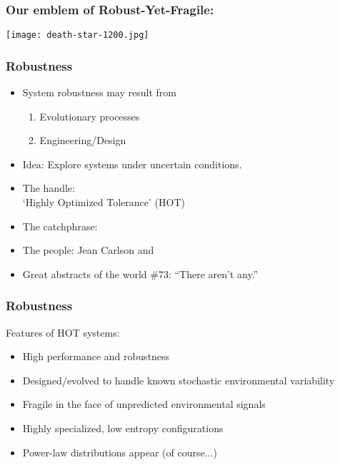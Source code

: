 
\begin{frame}
  \frametitle{Our emblem of Robust-Yet-Fragile:}

  \texttt{[image: death-star-1200.jpg]}

\end{frame}


\begin{frame}
  \frametitle{Robustness}
    
  \begin{block}{}
    \begin{itemize}
    \item<1-> 
      System robustness may result from 
      \begin{enumerate}
      \item<2-> 
        \alert{Evolutionary processes}
      \item<3-> 
        \alert{Engineering/Design}
      \end{enumerate}
    \item <4-> Idea: Explore systems 
      under \alert{uncertain conditions}.
    \item <5-> 
      The handle:\\
      `Highly Optimized Tolerance' (HOT)\cite{carlson1999a,carlson2000a,carlson2002a,sornette2003a}
    \item <6-> 
      The catchphrase: 
    \item <7-> 
      The people: Jean Carlson and 
    \item <8-> 
      Great abstracts of the world \#73: ``There aren't any.''\cite{doyle1978a}
    \end{itemize}
  \end{block}

\end{frame}

\begin{frame}
  \frametitle{Robustness}

  \begin{block}{Features of HOT systems:\cite{carlson2000a,carlson2002a}}
    \begin{itemize}
    \item<2-> 
      High performance and robustness
    \item<3-> 
      Designed/evolved to handle known 
      stochastic environmental variability
    \item<4-> 
      \alert{Fragile} in the face of unpredicted environmental signals
    \item<5-> 
      Highly specialized, low entropy configurations
    \item<6-> 
      Power-law distributions appear (of course...)
    \end{itemize}
    
  \end{block}
\end{frame}

